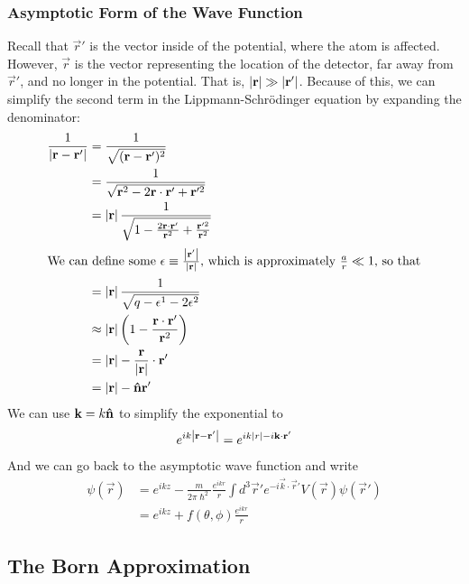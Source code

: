 \documentclass[a4paper]{article}
\begin{document}
\subsubsection{Asymptotic Form of the Wave Function}

Recall that $\vec{r}'$ is the vector inside of the potential, where the atom is
affected. However, $\vec{r}$ is the vector representing the location of the
detector, far away from $\vec{r}'$, and no longer in the potential. That is,
$\abs{\vec{r}}\gg\abs{\vec{r}'}$. Because of this, we can simplify the second
term in the Lippmann-Schr\"odinger equation by expanding the denominator:
\begin{align*}
	\frac{1}{\abs{\vec{r}-\vec{r}'}}
	&= \frac{1}{\sqrt{(\vec{r}-\vec{r}')^2}}\\
	&= \frac{1}{\sqrt{\vec{r}^2-2\vec{r}\cdot\vec{r}'+\vec{r}'^2}}\\
	&= \abs{\vec{r}}\frac{1}{\sqrt{1-\frac{2\vec{r}\cdot\vec{r}'}{\vec{r}^2}+
	\frac{\vec{r}'^2}{\vec{r}^2}}}\\
\intertext{We can define some \(\epsilon \equiv
\frac{\abs{\vec{r}'}}{\abs{\vec{r}}}\), which is approximately
$\frac{a}{r}\ll1$, so that}
	&= \abs{\vec{r}}\frac{1}{\sqrt{q-\epsilon^1-2\epsilon^2}}\\
	&\approx
	\abs{\vec{r}}\left(1-\frac{\vec{r}\cdot\vec{r}'}{\vec{r}^2}\right)\\
	&= \abs{\vec{r}} - \frac{\vec{r}}{\abs{\vec{r}}}\cdot\vec{r}'\\
	&= \abs{\vec{r}} - \vhat{n}\vec{r}'
\end{align*}
We can use $\vec{k}=k\vhat{n}$ to simplify the exponential to
\[
	e^{ik\abs{\vec{r}-\vec{r}'}} = e^{ik\abs{r}-i\vec{k}\cdot\vec{r}'}
\]
And we can go back to the asymptotic wave function and write 
\begin{align*}
	\psi(\vec{r}) &= e^{ikz} - \frac{m}{2\pi\hslash^2}\frac{e^{ikr}}{r}
	\int d^3\vec{r}'e^{-i\vec{k}\cdot\vec{r}'}V(\vec{r})\psi(\vec{r}')\\
	&= e^{ikz} + f(\theta,\phi)\frac{e^{ikr}}{r}
\end{align*}

\subsection{The Born Approximation}
\end{document}
